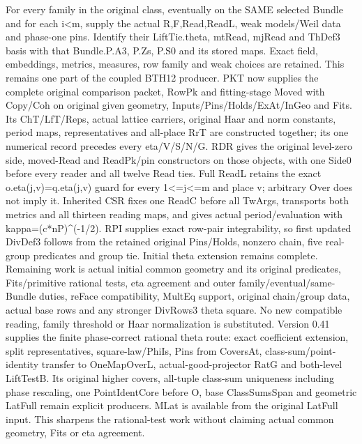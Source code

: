 For every family in the original class, eventually on the SAME selected Bundle and for each i<m, supply the actual R,F,Read,ReadL, weak models/\allowbreak{}Weil data and phase-one pins. Identify their LiftTie.theta, mtRead, mjRead and ThDef3 basis with that Bundle.P.A3, P.Zs, P.S0 and its stored maps. Exact field, embeddings, metrics, measures, row family and weak choices are retained. This remains one part of the coupled BTH12 producer. PKT now supplies the complete original comparison packet, RowPk and fitting-stage Moved with Copy/\allowbreak{}Coh on original given geometry, Inputs/\allowbreak{}Pins/\allowbreak{}Holds/\allowbreak{}ExAt/\allowbreak{}InGeo and Fits. Its ChT/\allowbreak{}LfT/\allowbreak{}Reps, actual lattice carriers, original Haar and norm constants, period maps, representatives and all-place RrT are constructed together; its one numerical record precedes every eta/\allowbreak{}V/\allowbreak{}S/\allowbreak{}N/\allowbreak{}G. RDR gives the original level-zero side, moved-Read and ReadPk/\allowbreak{}pin constructors on those objects, with one Side0 before every reader and all twelve Read ties. Full ReadL retains the exact o.eta(j,v)=q.eta(j,v) guard for every 1<=j<=m and place v; arbitrary Over does not imply it. Inherited CSR fixes one ReadC before all TwArgs, transports both metrics and all thirteen reading maps, and gives actual period/\allowbreak{}evaluation with kappa=(c*nP)\textasciicircum{}(-1/\allowbreak{}2). RPI supplies exact row-pair integrability, so first updated DivDef3 follows from the retained original Pins/\allowbreak{}Holds, nonzero chain, five real-group predicates and group tie. Initial theta extension remains complete. Remaining work is actual initial common geometry and its original predicates, Fits/\allowbreak{}primitive rational tests, eta agreement and outer family/\allowbreak{}eventual/\allowbreak{}same-Bundle duties, reFace compatibility, MultEq support, original chain/\allowbreak{}group data, actual base rows and any stronger DivRows3 theta square. No new compatible reading, family threshold or Haar normalization is substituted. Version 0.41 supplies the finite phase-correct rational theta route: exact coefficient extension, split representatives, square-law/\allowbreak{}PhiIs, Pins from CoversAt, class-sum/\allowbreak{}point-identity transfer to OneMapOverL, actual-good-projector RatG and both-level LiftTestB. Its original higher covers, all-tuple class-sum uniqueness including phase rescaling, one PointIdentCore before O, base ClassSumsSpan and geometric LatFull remain explicit producers. MLat is available from the original LatFull input. This sharpens the rational-test work without claiming actual common geometry, Fits or eta agreement.

